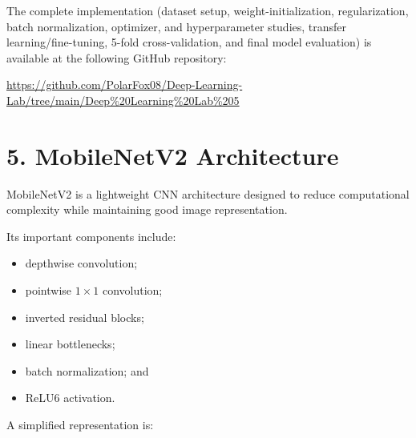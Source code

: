 \documentclass[10pt]{article}
\begin{document}
The complete implementation (dataset setup, weight-initialization,
regularization, batch normalization, optimizer, and hyperparameter
studies, transfer learning/fine-tuning, 5-fold cross-validation, and
final model evaluation) is available at the following GitHub repository:

\begin{center}
\url{https://github.com/PolarFox08/Deep-Learning-Lab/tree/main/Deep%20Learning%20Lab%205}
\end{center}

\section*{5. MobileNetV2 Architecture}

MobileNetV2 is a lightweight CNN architecture designed to reduce
computational complexity while maintaining good image representation.

Its important components include:

\begin{itemize}
\item depthwise convolution;
\item pointwise $1\times1$ convolution;
\item inverted residual blocks;
\item linear bottlenecks;
\item batch normalization; and
\item ReLU6 activation.
\end{itemize}

A simplified representation is:

\begin{center}
\end{center}
\end{document}

